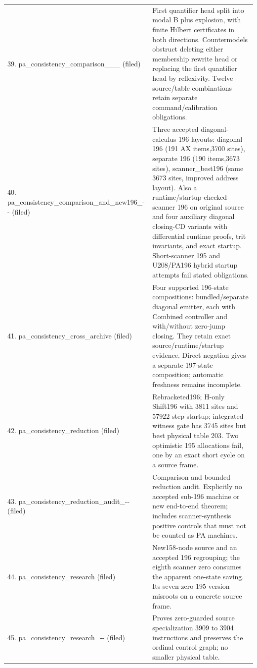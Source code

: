 \begin{longtable}{@{}p{4.5cm}p{11.1cm}@{}}
39. pa\_\allowbreak consistency\_\allowbreak comparison\_\allowbreak 2026\_\allowbreak 11\_\allowbreak 13 (filed) & First quantifier head split into modal B plus explosion, with finite Hilbert certificates in both directions. Countermodels obstruct deleting either membership rewrite head or replacing the first quantifier head by reflexivity. Twelve source/table combinations retain separate command/calibration obligations.\\[5pt]
40. pa\_\allowbreak consistency\_\allowbreak comparison\_\allowbreak and\_\allowbreak new196\_\allowbreak 2026-\allowbreak 11-\allowbreak 13 (filed) & Three accepted diagonal-calculus 196 layouts: diagonal 196 (191 AX items,3700 sites), separate 196 (190 items,3673 sites), scanner\_best196 (same 3673 sites, improved address layout). Also a runtime/startup-checked scanner 196 on original source and four auxiliary diagonal closing-CD variants with differential runtime proofs, trit invariants, and exact startup. Short-scanner 195 and U208/PA196 hybrid startup attempts fail stated obligations.\\[5pt]
41. pa\_\allowbreak consistency\_\allowbreak cross\_\allowbreak archive (filed) & Four supported 196-state compositions: bundled/separate diagonal emitter, each with Combined controller and with/without zero-jump closing. They retain exact source/runtime/startup evidence. Direct negation gives a separate 197-state composition; automatic freshness remains incomplete.\\[5pt]
42. pa\_\allowbreak consistency\_\allowbreak reduction (filed) & Rebracketed196; H-only Shift196 with 3811 sites and 57922-step startup; integrated witness gate has 3745 sites but best physical table 203. Two optimistic 195 allocations fail, one by an exact short cycle on a source frame.\\[5pt]
43. pa\_\allowbreak consistency\_\allowbreak reduction\_\allowbreak audit\_\allowbreak 2026-\allowbreak 11-\allowbreak 14 (filed) & Comparison and bounded reduction audit. Explicitly no accepted sub-196 machine or new end-to-end theorem; includes scanner-synthesis positive controls that must not be counted as PA machines.\\[5pt]
44. pa\_\allowbreak consistency\_\allowbreak research (filed) & New158-node source and an accepted 196 regrouping; the eighth scanner zero consumes the apparent one-state saving. Its seven-zero 195 version misroots on a concrete source frame.\\[5pt]
45. pa\_\allowbreak consistency\_\allowbreak research\_\allowbreak 2026-\allowbreak 10-\allowbreak 29 (filed) & Proves zero-guarded source specialization 3909 to 3904 instructions and preserves the ordinal control graph; no smaller physical table.\\[5pt]

\end{longtable}
